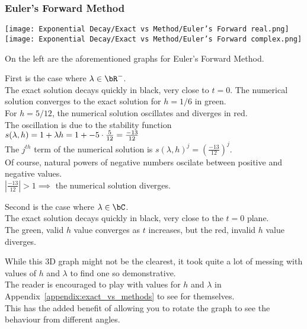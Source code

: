 \subsubsection{Euler's Forward Method}
\begin{multicols}{2}
	\begin{center}
	\texttt{[image: Exponential Decay/Exact vs Method/Euler's Forward real.png]}
        \texttt{[image: Exponential Decay/Exact vs Method/Euler's Forward complex.png]}
	\end{center}
\columnbreak{}
	\par On the left are the aforementioned graphs for Euler's Forward Method.\\
	
	\par First is the case where $\lambda \in \bR^{-}$.\\
	The exact solution decays quickly in black, very close to $t=0$.
	The numerical solution converges to the exact solution for $h = 1/6$ in green.\\
	For $h = 5/12$, the numerical solution oscillates and diverges in red.\\
	The oscillation is due to the stability function\\
	$s(\lambda, h) = 1 + \lambda h = 1 + -5\cdot\frac{5}{12} = \frac{-13}{12}$\\
	The $j^{th}$ term of the numerical solution is ${s(\lambda, h)}^j = {\left(\frac{-13}{12}\right)}^j$.\\
	Of course, natural powers of negative numbers oscilate between positive and negative values.\\
	$|\frac{-13}{12}| > 1 \implies$ the numerical solution diverges.\\

	\par Second is the case where $\lambda \in \bC$.\\
	The exact solution decays quickly in black, very close to the $t=0$ plane.\\
	The green, valid $h$ value converges as $t$ increases, but the red, invalid $h$ value diverges.\\
        
        \par While this 3D graph might not be the clearest, it took quite a lot of messing with values of $h$ and $\lambda$ to find one so demonstrative.\\
	The reader is encouraged to play with values for $h$ and $\lambda$ in \\
	Appendix~\ref{appendix:exact_vs_methods} to see for themselves.\\
	This has the added benefit of allowing you to rotate the graph to see the behaviour from different angles.
\end{multicols}
\newpage
